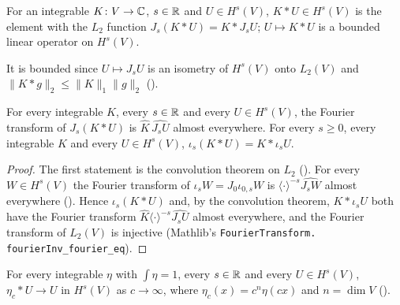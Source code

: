 \begin{definition}[Convolution in $H^s(V)$]
\label{def:sobolev-convolution}
\leanok
{}
For an integrable $K \colon V \to \mathbb{C}$, $s \in \mathbb{R}$ and $U \in H^s(V)$, $K * U \in H^s(V)$ is the
element with the $L_2$ function $J_s (K * U) = K * J_s U$; $U \mapsto K * U$ is a bounded linear
operator on $H^s(V)$.
\end{definition}

It is bounded since $U \mapsto J_s U$ is an isometry of $H^s(V)$ onto $L_2(V)$ and
$\|K * g\|_2 \leq \|K\|_1 \|g\|_2$ ().

\begin{lemma}
\label{lem:sobolev-convolution-l2}
\leanok
{}
For every integrable $K$, every $s \in \mathbb{R}$ and every $U \in H^s(V)$, the Fourier transform of
$J_s (K * U)$ is $\hat K \, \widehat{J_s U}$ almost everywhere. For every $s \geq 0$, every
integrable $K$ and every $U \in H^s(V)$, $\iota_s (K * U) = K * \iota_s U$.
\end{lemma}

\begin{proof}
\leanok
The first statement is the convolution theorem on $L_2$ ().
For every $W \in H^s(V)$ the Fourier transform of $\iota_s W = J_0 \iota_{0,s} W$ is
$\langle \cdot \rangle^{-s} \widehat{J_s W}$ almost everywhere ().
Hence $\iota_s (K * U)$ and, by the convolution theorem, $K * \iota_s U$ both have the Fourier
transform $\hat K \langle \cdot \rangle^{-s} \widehat{J_s U}$ almost everywhere, and the Fourier
transform of $L_2(V)$ is injective (Mathlib's \texttt{FourierTransform.\allowbreak
fourierInv\_\allowbreak fourier\_\allowbreak eq}).
\end{proof}

\begin{theorem}[Mollification in $H^s(V)$]
\label{thm:sobolev-mollification}
\leanok
{}
For every integrable $\eta$ with $\int \eta = 1$, every $s \in \mathbb{R}$ and every $U \in H^s(V)$,
$\eta_c * U \to U$ in $H^s(V)$ as $c \to \infty$, where $\eta_c(x) = c^n \eta(c x)$ and
$n = \dim V$ ().
\end{theorem}


